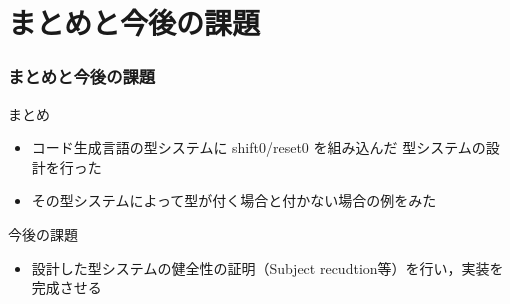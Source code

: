 \documentclass[dvipdfmx,cjk,xcolor=dvipsnames,envcountsect,notheorems,12pt]{beamer}
\newcommand\cfun[2]{\underline{\lambda}{#1}.{#2}}
\newcommand\cResetz{\underline{\textbf{reset0}}}
\newcommand\cShiftz{\underline{\textbf{shift0}}}
\newcommand\cThrow{\underline{\textbf{throw}}}
\newcommand\cresetz[1]{\cResetz~{#1}}
\newcommand\cshiftz[2]{\cShiftz~{#1}\to{#2}}
\newcommand\cthrow[2]{\cThrow~{#1}~{#2}}
\newcommand\cLet{\underline{\textbf{clet}}}
\newcommand\cIn{\underline{\textbf{in}}}
\newcommand\clet[3]{\cLet~{#1}={#2}~\cIn~{#3}}
\newcommand\codeT[2]{\langle{#1}\rangle^{#2}}
\newcommand\contT[2]{({#1} \Rightarrow {#2})}
\newcommand\ord{\ge}
\theoremstyle{definition}
\begin{document}






\section{まとめと今後の課題}
\begin{frame}
  \frametitle{まとめと今後の課題}
  まとめ
  \begin{itemize}
  \item コード生成言語の型システムに shift0/reset0 を組み込んだ 型システムの設計を行った
  \item その型システムによって型が付く場合と付かない場合の例をみた
  \end{itemize}

  今後の課題
  \begin{itemize}
    \item 設計した型システムの健全性の証明（Subject recudtion等）を行い，実装を完成させる
  \end{itemize}
\end{frame}
\end{document}
